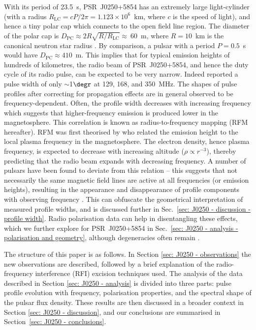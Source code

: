 With its period of 23.5~s, PSR~J0250+5854 has an extremely large light-cylinder (with a radius $R_\mathrm{LC} = cP/2\pi =  1.123\times10^{6}$~km, where $c$ is the speed of light), and hence a tiny polar cap which connects to the open field line region. The diameter of the polar cap is $D_\mathrm{PC} \approx 2R\sqrt{R/R_\mathrm{LC}} \approx~60$~m, where $R = 10$~km is the canonical neutron star radius \citep[e.g.][]{Sxxx1971}. By comparison, a pulsar with a period $P = 0.5$~s would have $D_\mathrm{PC} \approx 410$~m. This implies that for typical emission heights of hundreds of kilometres, the radio beam of PSR~J0250+5854, and hence the duty cycle of its radio pulse, can be expected to be very narrow. Indeed \citet{TBC+2018} reported a pulse width of only $\sim$1$\degr$ at 129, 168, and 350~MHz. The shapes of pulse profiles after correcting for propagation effects are in general observed to be frequency-dependent. Often, the profile width decreases with increasing frequency which suggests that higher-frequency emission is produced lower in the magnetosphere. This correlation is known as radius-to-frequency mapping (RFM hereafter). RFM was first theorised by \citet{RSxx1975} who related the emission height to the local plasma frequency in the magnetosphere. The electron density, hence plasma frequency, is expected to decrease with increasing altitude ($\rho \propto r^{-3}$), thereby predicting that the radio beam expands with decreasing frequency. A number of pulsars have been found to deviate from this relation \citep[e.g.][]{Txxx1991, CWxx2014,PHS+2016} -- this suggests that not necessarily the same magnetic field lines are active at all frequencies (or emission heights), resulting in the appearance and disappearance of profile components with observing frequency \citep[e.g.][]{Cxxx1978, MRxx2002}. This can obfuscate the geometrical interpretation of measured profile widths, and is discussed further in Sec.~\ref{sec: J0250 - discussion - profile width}. Radio polarisation data can help in disentangling these effects, which we further explore for PSR~J0250+5854 in Sec.~\ref{sec: J0250 - analysis - polarisation and geometry}, although degeneracies often remain \citep[e.g.][]{KJW+2010}.

The structure of this paper is as follows. In Section \ref{sec: J0250 - observations} the new observations are described, followed by a brief explanation of the radio-frequency interference (RFI) excision techniques used. The analysis of the data described in Section \ref{sec: J0250 - analysis} is divided into three parts: pulse profile evolution with frequency, polarisation properties, and the spectral shape of the pulsar flux density. These results are then discussed in a broader context in Section \ref{sec: J0250 - discussion}, and our conclusions are summarised in Section~\ref{sec: J0250 - conclusions}.




















